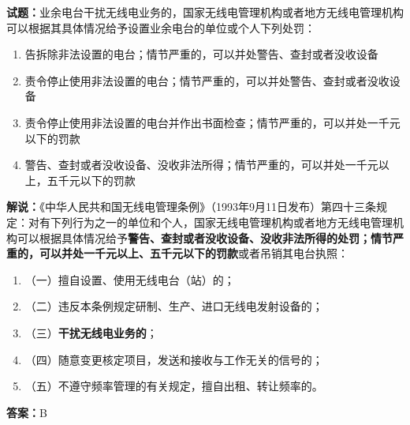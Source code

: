 \documentclass{ctexbook}
\begin{document}



\bigskip


\noindent\textbf{试题：}业余电台干扰无线电业务的，国家无线电管理机构或者地方无线电管理机构可以根据其具体情况给予设置业余电台的单位或个人下列处罚：
\begin{enumerate}[leftmargin=3em]
	\item  告拆除非法设置的电台；情节严重的，可以并处警告、查封或者没收设备
	\item  责令停止使用非法设置的电台；情节严重的，可以并处警告、查封或者没收设备
	\item  责令停止使用非法设置的电台并作出书面检查；情节严重的，可以并处一千元以下的罚款
	\item  警告、查封或者没收设备、没收非法所得；情节严重的，可以并处一千元以上，五千元以下的罚款
\end{enumerate}
\noindent\textbf{解说：}《中华人民共和国无线电管理条例》（1993年9月11日发布）第四十三条规定：对有下列行为之一的单位和个人，国家无线电管理机构或者地方无线电管理机构可以根据具体情况给予\textbf{警告、查封或者没收设备、没收非法所得的处罚；情节严重的，可以并处一千元以上、五千元以下的罚款}或者吊销其电台执照：
\begin{enumerate}[leftmargin=3em, label=]
	\item（一）擅自设置、使用无线电台（站）的；
	\item（二）违反本条例规定研制、生产、进口无线电发射设备的；
	\item（三）\textbf{干扰无线电业务的}；
	\item（四）随意变更核定项目，发送和接收与工作无关的信号的；
	\item（五）不遵守频率管理的有关规定，擅自出租、转让频率的。
\end{enumerate}
\textbf{答案：}B



\bigskip
\end{document}
